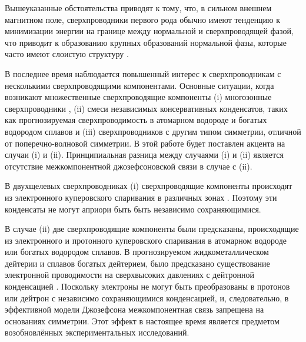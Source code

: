 Вышеуказанные обстоятельства приводят к тому, что, в сильном внешнем магнитном 
поле, сверхпроводники первого рода обычно имеют тенденцию к минимизации 
энергии на границе между нормальной и сверхпроводящей фазой, что приводит к 
образованию крупных образований нормальной фазы, которые часто имеют слоистую 
структуру \cite{bib:4}. 

В последнее время наблюдается повышенный интерес к сверхпроводникам с 
несколькими сверхпроводящими компонентами. Основные ситуации, когда возникают 
множественные сверхпроводящие компоненты (i) многозонные сверхпроводники
\cite{bib:6,bib:7,bib:8,bib:9,bib:10,bib:11}, (ii) смеси независимых 
консервативных конденсатов, таких как прогнозируемая сверхпроводимость в 
атомарном водороде и богатых водородом сплавов 
\cite{bib:12.1,bib:12.2,bib:13,bib:14} и (iii) сверхпроводников с другим типом 
симметрии, отличной от поперечно-волновой симметрии. В этой работе будет 
поставлен акцента на случаи (i) и (ii). Принципиальная разница между случаями 
(i) и (ii) является отсутствие межкомпонентной джозефсоновской связи в случае 
с (ii).

В двухщелевых сверхпроводниках (i) сверхпроводящие компоненты происходят из
электронного куперовского спаривания в различных зонах \cite{bib:6}. Поэтому 
эти конденсаты не могут априори быть быть независимо сохраняющимися.

В случае (ii) две сверхпроводящие компоненты были предсказаны, происходящие 
из электронного и протонного куперовского спаривания в атомарном водороде 
или богатых водородом сплавов. В прогнозируемом жидкометаллическом дейтерии и 
сплавов богатых дейтерием, было предсказано существование электронной 
проводимости на сверхвысоких давлениях с дейтронной конденсацией  
\cite{bib:12.1,bib:12.2,bib:13,bib:14}. Поскольку электроны не могут быть 
преобразованы в протонов или дейтрон с независимо сохраняющимися 
конденсацией, и, следовательно, в эффективной модели Джозефсона 
межкомпонентная связь запрещена на основаниях симметрии. Этот эффект в 
настоящее время является предметом возобновлённых экспериментальных 
исследований.

